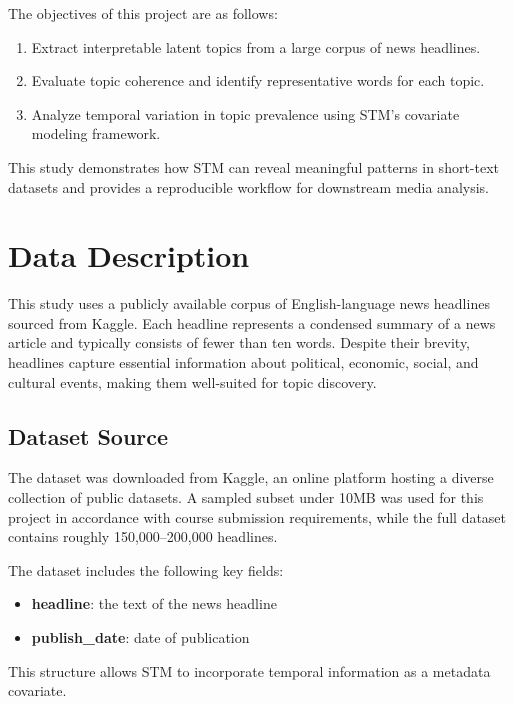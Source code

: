 \documentclass[11pt]{article}
\begin{document}
The objectives of this project are as follows:
\begin{enumerate}[leftmargin=1.2cm]
    \item Extract interpretable latent topics from a large corpus of news headlines.
    \item Evaluate topic coherence and identify representative words for each topic.
    \item Analyze temporal variation in topic prevalence using STM's covariate modeling framework.
\end{enumerate}

This study demonstrates how STM can reveal meaningful patterns in short-text datasets and provides a reproducible workflow for downstream media analysis.

\section{Data Description}

This study uses a publicly available corpus of English-language news headlines sourced from Kaggle. Each headline represents a condensed summary of a news article and typically consists of fewer than ten words. Despite their brevity, headlines capture essential information about political, economic, social, and cultural events, making them well-suited for topic discovery.

\subsection{Dataset Source}

The dataset was downloaded from Kaggle, an online platform hosting a diverse collection of public datasets. A sampled subset under 10MB was used for this project in accordance with course submission requirements, while the full dataset contains roughly 150,000--200,000 headlines.

The dataset includes the following key fields:
\begin{itemize}
    \item \textbf{headline}: the text of the news headline
    \item \textbf{publish\_date}: date of publication
\end{itemize}

This structure allows STM to incorporate temporal information as a metadata covariate.
\end{document}
